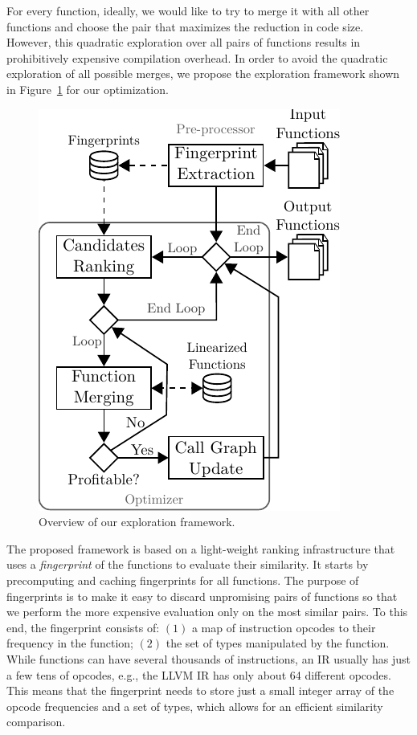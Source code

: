 For every function, ideally, we would like to try to merge it with all other functions and choose the pair that maximizes the reduction in
code size. However, this quadratic exploration over all pairs of functions results in prohibitively expensive compilation
overhead. In order to avoid the quadratic exploration of all possible merges, we propose the exploration framework shown in
Figure~\ref{fig:func-merge-opt-arch} for our optimization.
\begin{figure}[t!]
  \centering
  \includegraphics[width=0.65\linewidth]{figs/func-merge-opt-arch.pdf}
  \caption{Overview of our exploration framework.}
  \label{fig:func-merge-opt-arch}
\end{figure}

The proposed framework is based on a light-weight ranking infrastructure that uses a \textit{fingerprint} of the functions to evaluate
their similarity. It starts by precomputing and caching fingerprints for all functions. The purpose of fingerprints is to make it easy
to discard unpromising pairs of functions so that we perform the more expensive evaluation only on the most similar pairs.
To this end, the fingerprint consists of: $(1)$ a map of instruction opcodes to their frequency in the function; $(2)$ the set of types
manipulated by the function. While functions can have several thousands of instructions, an IR usually has just a few tens of opcodes,
e.g., the LLVM IR has only about 64 different opcodes. This means that the fingerprint needs to store just a small integer array of the
opcode frequencies and a set of types, which allows for an efficient similarity comparison.

